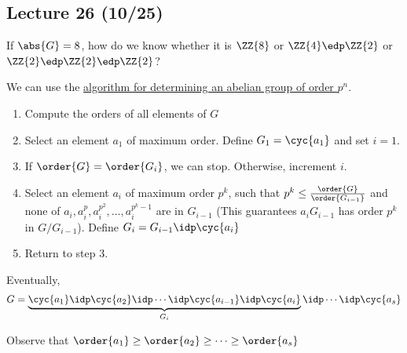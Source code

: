 \subsection*{Lecture 26 (10/25)} %

If \(\abs{G} = 8\), how do we know whether it is \(\ZZ{8}\) or \(\ZZ{4}\edp\ZZ{2}\) or \(\ZZ{2}\edp\ZZ{2}\edp\ZZ{2}\)?

We can use the \uline{algorithm for determining an abelian group of order \(p^n\)}.

\begin{enumerate}[label=Step \arabic*., left=0pt, labelsep=1em]
\item Compute the orders of all elements of \(G\)
\item Select an element \(a_1\) of maximum order. Define \(G_1=\cyc{a_1}\) and set \(i=1\).
\item If \(\order{G} = \order{G_i}\), we can stop. Otherwise, increment \(i\).
\item Select an element \(a_i\) of maximum order \(p^k\), such that \(p^k\leq \frac{\order{G}}{\order{G_{i-1}}}\) and none of \(a_i, a_i^p, a_i^{p^2}, \ldots, a_i^{p^k-1}\) are in \(G_{i-1}\) (This guarantees \(a_iG_{i-1}\) has order \(p^k\) in \(G/G_{i-1}\)). Define \(G_i = G_{i-1}\idp \cyc{a_i}\)
\item Return to step 3.
\end{enumerate}
Eventually, \begin{align*}
G=\underbrace{\cyc{a_1}\idp\cyc{a_2}\idp\cdots\idp\cyc{a_{i-1}}\idp\cyc{a_i}}_{G_i}\idp \cdots\idp\cyc{a_s}
\end{align*}
\begin{note}
Observe that \(\order{a_1}\geq \order{a_2}\geq \cdots \geq \order{a_s}\)
\end{note}

